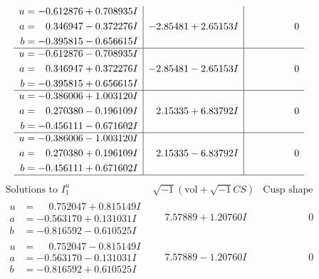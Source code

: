 \documentclass[1p]{elsarticle_modified}
\theoremstyle{definition}
\newcommand{\I}{\sqrt{-1}}
\begin{document}
$$\begin{array}{c|c|c}
\begin{aligned}
u &= -0.612876 + 0.708935 I \\
a &= \phantom{-}0.346947 - 0.372276 I \\
b &= -0.395815 - 0.656615 I\end{aligned}
 & -2.85481 + 2.65153 I & \phantom{-0.000000 } 0 \\ \hline\begin{aligned}
u &= -0.612876 - 0.708935 I \\
a &= \phantom{-}0.346947 + 0.372276 I \\
b &= -0.395815 + 0.656615 I\end{aligned}
 & -2.85481 - 2.65153 I & \phantom{-0.000000 } 0 \\ \hline\begin{aligned}
u &= -0.386006 + 1.003120 I \\
a &= \phantom{-}0.270380 - 0.196109 I \\
b &= -0.456111 - 0.671602 I\end{aligned}
 & \phantom{-}2.15335 + 6.83792 I & \phantom{-0.000000 } 0 \\ \hline\begin{aligned}
u &= -0.386006 - 1.003120 I \\
a &= \phantom{-}0.270380 + 0.196109 I \\
b &= -0.456111 + 0.671602 I\end{aligned}
 & \phantom{-}2.15335 - 6.83792 I & \phantom{-0.000000 } 0\\
 \hline 
 \end{array}$$\newpage$$\begin{array}{c|c|c}  
\text{Solutions to }I^u_{1}& \I (\text{vol} + \sqrt{-1}CS) & \text{Cusp shape}\\
 \hline 
\begin{aligned}
u &= \phantom{-}0.752047 + 0.815149 I \\
a &= -0.563170 + 0.131031 I \\
b &= -0.816592 - 0.610525 I\end{aligned}
 & \phantom{-}7.57889 + 1.20760 I & \phantom{-0.000000 } 0 \\ \hline\begin{aligned}
u &= \phantom{-}0.752047 - 0.815149 I \\
a &= -0.563170 - 0.131031 I \\
b &= -0.816592 + 0.610525 I\end{aligned}
 & \phantom{-}7.57889 - 1.20760 I & \phantom{-0.000000 } 0 \\ \hline\begin{aligned}

\end{aligned}
\end{array}$$
\end{document}
